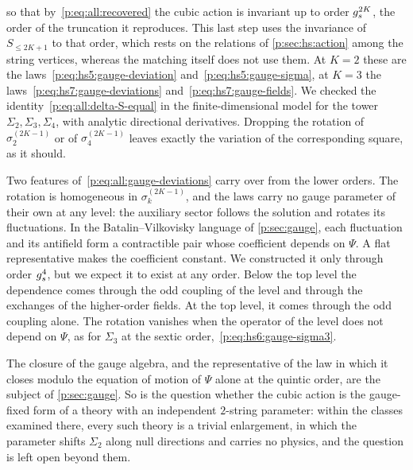so that by~\eqref{p:eq:all:recovered} the cubic action is invariant up to order $g_s^{2 K}$, the order of the truncation it reproduces.
This last step uses the invariance of $S_{\le 2 K + 1}$ to that order, which rests on the relations of \cref{p:sec:hs:action} among the string vertices, whereas the matching itself does not use them.
At $K = 2$ these are the laws~\eqref{p:eq:hs5:gauge-deviation} and~\eqref{p:eq:hs5:gauge-sigma}, at $K = 3$ the laws~\eqref{p:eq:hs7:gauge-deviations} and~\eqref{p:eq:hs7:gauge-fields}.
We checked the identity~\eqref{p:eq:all:delta-S-equal} in the finite-dimensional model for the tower $\Sigma_2, \Sigma_3, \Sigma_4$, with analytic directional derivatives.
Dropping the rotation of $\sigma_2^{(2 K - 1)}$ or of $\sigma_4^{(2 K - 1)}$ leaves exactly the variation of the corresponding square, as it should.

Two features of~\eqref{p:eq:all:gauge-deviations} carry over from the lower orders.
The rotation is homogeneous in $\sigma_k^{(2 K - 1)}$, and the laws carry no gauge parameter of their own at any level: the auxiliary sector follows the solution and rotates its fluctuations.
In the Batalin--Vilkovisky language of \cref{p:sec:gauge}, each fluctuation and its antifield form a contractible pair whose coefficient depends on $\Psi$.
A flat representative makes the coefficient constant.
We constructed it only through order $g_s^4$, but we expect it to exist at any order.
Below the top level the dependence comes through the odd coupling of the level and through the exchanges of the higher-order fields.
At the top level, it comes through the odd coupling alone.
The rotation vanishes when the operator of the level does not depend on $\Psi$, as for $\Sigma_3$ at the sextic order,~\eqref{p:eq:hs6:gauge-sigma3}.

The closure of the gauge algebra, and the representative of the law in which it closes modulo the equation of motion of $\Psi$ alone at the quintic order, are the subject of \cref{p:sec:gauge}.
So is the question whether the cubic action is the gauge-fixed form of a theory with an independent $2$-string parameter: within the classes examined there, every such theory is a trivial enlargement, in which the parameter shifts $\Sigma_2$ along null directions and carries no physics, and the question is left open beyond them.

